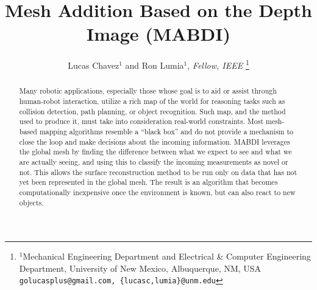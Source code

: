 \documentclass[letterpaper, 10pt, conference, final]{ieeeconf}  %
\title{\LARGE \bf
Mesh Addition Based on the Depth Image (MABDI)
}
\author{Lucas Chavez$^{1}$ and Ron Lumia$^{1}$, \textit{Fellow, IEEE}%
\thanks{$^{1}$Mechanical Engineering Department and Electrical \& Computer Engineering Department, University of New Mexico,
	Albuquerque, NM, USA
        {\tt\small golucasplus@gmail.com, \{lucasc,lumia\}@unm.edu}}%
}%
\begin{document}
\maketitle
\thispagestyle{empty}
\pagestyle{empty}


\begin{abstract}


Many robotic applications, especially those whose goal is to aid or assist
through human-robot interaction, utilize a rich map of the world for reasoning
tasks such as collision detection, path planning, or object recognition. Such
map, and the method used to produce it, must take into consideration real-world
constraints. Most mesh-based mapping algorithms resemble a ``black box'' and do
not provide a mechanism to close the loop and make decisions about the
incoming information. MABDI leverages the global mesh by finding the difference
between what we expect to see and what we are actually seeing, and using this to
classify the incoming measurements as novel or not. This allows the surface
reconstruction method to be run only on data that has not yet been represented in
the global mesh. The result is an algorithm that becomes computationally
inexpensive once the environment is known, but can also react to new objects.


\end{abstract}














\end{document}
